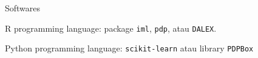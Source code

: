 \documentclass[aspectratio=169]{beamer}
\begin{document}
\begin{frame}{Softwares}
	\begin{vfilleditems}
		\item R programming language: package \texttt{iml}, \texttt{pdp}, atau \texttt{DALEX}.
		\item Python programming language: \texttt{scikit-learn} atau library \texttt{PDPBox}
	\end{vfilleditems}
\end{frame}







%
%
%
\end{document}
